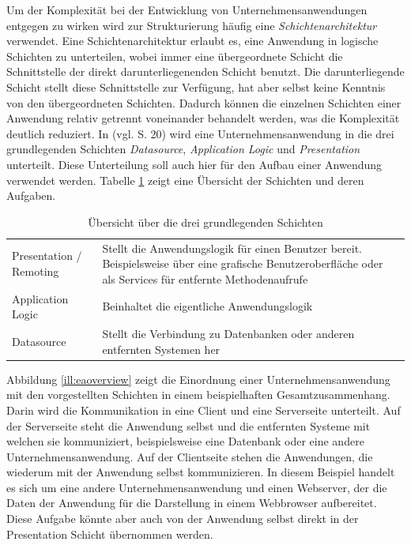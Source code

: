 Um der Komplexität bei der Entwicklung von Unternehmensanwendungen
entgegen zu wirken wird zur Strukturierung häufig eine
\emph{Schichtenarchitektur} verwendet. Eine Schichtenarchitektur erlaubt es,
eine Anwendung in logische Schichten zu unterteilen, wobei immer eine übergeordnete Schicht die
Schnittstelle der direkt darunterliegenenden Schicht benutzt. Die
darunterliegende Schicht stellt diese Schnittstelle zur Verfügung, hat aber
selbst keine Kenntnis von den übergeordneten Schichten. Dadurch können die
einzelnen Schichten einer Anwendung relativ getrennt voneinander behandelt
werden, was die Komplexität deutlich reduziert. In \cite{fowler:2002} (vgl. S.
20) wird eine Unternehmensanwendung in die drei grundlegenden Schichten
\emph{Datasource}, \emph{Application Logic} und \emph{Presentation} unterteilt.
Diese Unterteilung soll auch hier für den Aufbau einer Anwendung verwendet
werden. Tabelle \ref{tab:basiclayers} zeigt eine Übersicht der Schichten und
deren Aufgaben.

\begin{table}[h] \begin{tabularx}{\textwidth}{lX} \toprule
	\tableheadline{Schicht} & \tableheadline{Beschreibung} \\
	\midrule
	Presentation / Remoting & Stellt die Anwendungslogik für einen Benutzer
	bereit. Beispielsweise über eine grafische Benutzeroberfläche oder als Services
	für entfernte Methodenaufrufe \\
	\midrule
	Application Logic & Beinhaltet die eigentliche Anwendungslogik \\ 
	\midrule
	Datasource &
	Stellt die Verbindung zu Datenbanken oder anderen
	entfernten Systemen her	\\
	\bottomrule
	\end{tabularx}
	\caption{Übersicht über die drei grundlegenden Schichten}
	\label{tab:basiclayers}
\end{table}

Abbildung \ref{ill:eaoverview} zeigt die Einordnung einer Unternehmensanwendung
mit den vorgestellten Schichten in einem beispielhaften Gesamtzusammenhang. Darin
wird die Kommunikation in eine Client und eine Serverseite unterteilt. Auf der
Serverseite steht die Anwendung selbst und die entfernten Systeme mit welchen sie
kommuniziert, beispielsweise eine Datenbank oder eine andere
Unternehmensanwendung. Auf der Clientseite stehen die Anwendungen, die wiederum
mit der Anwendung selbst kommunizieren. In diesem Beispiel handelt es sich um
eine andere Unternehmensanwendung und einen Webserver, der die Daten der
Anwendung für die Darstellung in einem Webbrowser aufbereitet. Diese Aufgabe
könnte aber auch von der Anwendung selbst direkt in der Presentation Schicht
übernommen werden.

